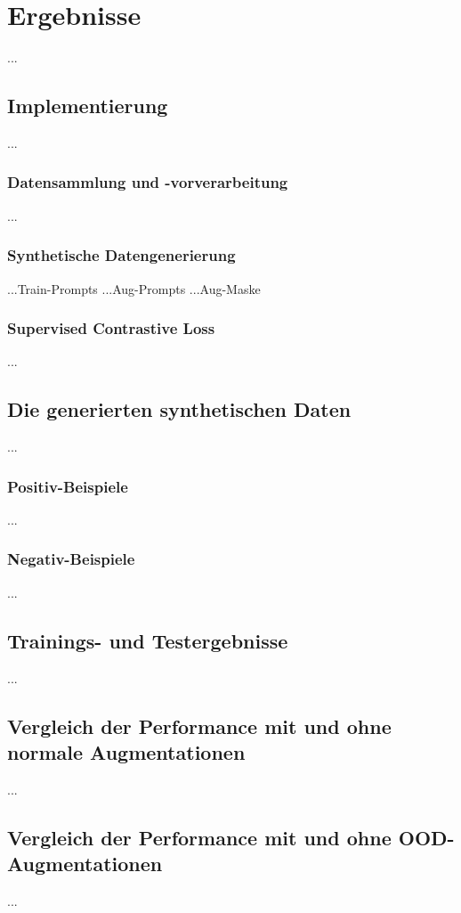 \chapter{Ergebnisse}

...

\section{Implementierung}

...

\subsection{Datensammlung und -vorverarbeitung}

...

\subsection{Synthetische Datengenerierung}

...Train-Prompts
...Aug-Prompts
...Aug-Maske

\subsection{Supervised Contrastive Loss}

...

\section{Die generierten synthetischen Daten}

...

\subsection{Positiv-Beispiele}

...

\subsection{Negativ-Beispiele}

...

\section{Trainings- und Testergebnisse}

...

\section{Vergleich der Performance mit und ohne normale Augmentationen}

...

\section{Vergleich der Performance mit und ohne OOD-Augmentationen}

...